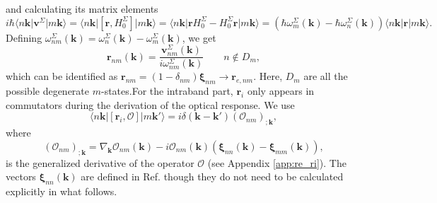 and calculating its matrix elements
\begin{equation}\label{conhrnm}
i\hbar\langle n\mathbf{k}\vert\mathbf{v}^\Sigma\vert m\mathbf{k}\rangle
= \langle n\mathbf{k}\vert
  \left[\mathbf{r},H^{\Sigma}_{0}\right]
  \vert m\mathbf{k}\rangle
= \langle n\mathbf{k}\vert
  \mathbf{r}H^{\Sigma}_{0} - H^{\Sigma}_{0}\mathbf{r}
  \vert m\mathbf{k}\rangle
= \left(
  \hbar\omega^{\Sigma}_{m}(\mathbf{k}) - \hbar\omega^{\Sigma}_{n}(\mathbf{k})
  \right)
  \langle n\mathbf{k}\vert\mathbf{r}\vert m\mathbf{k}\rangle.
\end{equation}
Defining $\omega^\Sigma_{nm}(\mathbf{k}) =
\omega^{\Sigma}_{n}(\mathbf{k}) - \omega^\Sigma_m(\mathbf{k})$, we get
\begin{equation}\label{pmnrmn}
\mathbf{r}_{nm}(\mathbf{k})
= \frac{\mathbf{v}^\Sigma_{nm}(\mathbf{k})}{i\omega^\Sigma_{nm}(\mathbf{k})}
\qquad n\notin D_{m},
\end{equation} 
which can be identified as
$\mathbf{r}_{nm}=(1-\delta_{nm})\boldsymbol{\xi}_{nm}\to \mathbf{r}_{e,nm}$.
Here, $D_m$ are all the possible degenerate $m$-states.For the intraband part,
$\mathbf{r}_i$ only appears in commutators during the derivation of the optical
response. We use \cite{aversaPRB95}
\begin{equation}\label{conmri3n}
\langle n\mathbf{k}\vert
\left[\mathbf{r}_{i},\mathcal{O}\right]
\vert m\mathbf{k}'\rangle
= i\delta(\mathbf{k} - \mathbf{k}')(\mathcal{O}_{nm})_{;\mathbf{k}},
\end{equation}  
where
\begin{equation}\label{gendevnn}
(\mathcal{O}_{nm})_{;\mathbf{k}} =
  \nabla_{\mathbf{k}}\mathcal{O}_{nm}(\mathbf{k})
- i\mathcal{O}_{nm}(\mathbf{k})
\left(
\boldsymbol{\xi}_{nn}(\mathbf{k}) - \boldsymbol{\xi}_{mm}(\mathbf{k})
\right),
\end{equation} 
is the generalized derivative of the operator $\mathcal{O}$ (see Appendix
\ref{app:re_ri}). The vectors $\boldsymbol{\xi}_{nn}(\mathbf{k})$ are defined in 
Ref. \cite{aversaPRB95} though they do not need to be calculated explicitly in
what follows.

